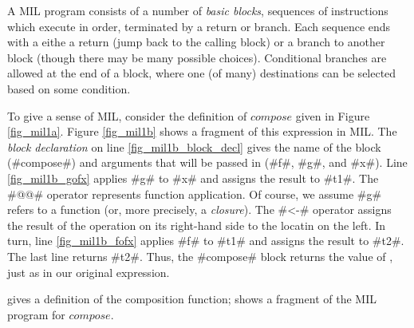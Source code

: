 \documentclass[12pt]{report}
\begin{document}
A MIL program consists of a number of \emph{basic blocks}, sequences
of instructions which execute in order, terminated by a return or
branch. Each sequence ends with a eithe a return (jump back to the
calling block) or a branch to another block (though there may be many
possible choices). Conditional branches are allowed at the end of a
block, where one (of many) destinations can be selected based on some
condition.

To give a sense of MIL, consider the definition of $compose$ given in
Figure \ref{fig_mil1a}. Figure \ref{fig_mil1b} shows a fragment of this 
expression in MIL. The \emph{block declaration}
on line \ref{fig_mil1b_block_decl} gives the name of
the block (#compose#) and arguments that will be passed in (#f#, #g#,
and #x#). Line \ref{fig_mil1b_gofx} applies #g# to #x# and assigns
the result to #t1#. The #@@# operator represents function application. 
Of course, we assume #g# refers to a function (or, more precisely, a 
\emph{closure}). The #<-# operator assigns the result of the operation
on its right-hand side to the locatin on the left. In turn, line 
\ref{fig_mil1b_fofx} applies #f# to #t1# and assigns the result
to #t2#. The last line returns #t2#. Thus, the #compose# block returns
the value of , just as in our original \lamA
expression.

\begin{myfig}[t]
  \subfloat[]{\label{fig_mil1b}}
  \caption{ gives a \lamA definition of the composition
    function;  shows a fragment of the MIL program
    for $compose$.}
  \label{fig_mil1}
\end{myfig}







\end{document}
